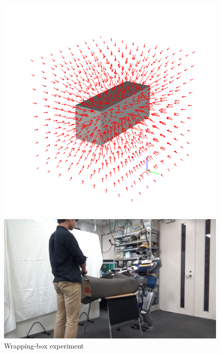 \vspace{-3mm}
\begin{figure}[htbp]
  \begin{minipage}{0.4\hsize}
    \begin{center}
      \includegraphics[width=1.00\columnwidth]{figs/electronic-potential-box-no-frame.png}
    \end{center}
  \end{minipage}
  \begin{minipage}{0.55\hsize}
    \begin{center}
      \includegraphics[width=1.00\columnwidth]{figs/image_wrap.png}
    \end{center}
  \end{minipage}
  \vspace{-3mm}
  \caption{Wrapping-box experiment}
  \label{figure:wrapping}
\end{figure}

